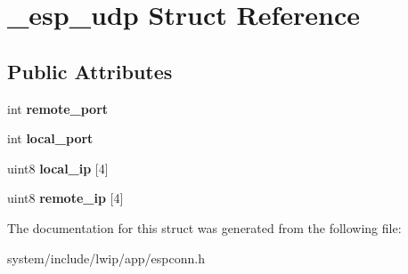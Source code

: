 \hypertarget{struct__esp__udp}{}\section{\+\_\+esp\+\_\+udp Struct Reference}
\label{struct__esp__udp}
\subsection*{Public Attributes}
\begin{DoxyCompactItemize}
\item 
\hypertarget{struct__esp__udp_ac8342d90f426d0ff9bbc1c8be704eaa0}{}int {\bfseries remote\+\_\+port}\label{struct__esp__udp_ac8342d90f426d0ff9bbc1c8be704eaa0}

\item 
\hypertarget{struct__esp__udp_a2c64465322b3d33e8866ff2c87cc1c60}{}int {\bfseries local\+\_\+port}\label{struct__esp__udp_a2c64465322b3d33e8866ff2c87cc1c60}

\item 
\hypertarget{struct__esp__udp_a9b4c948859d38e13285039031ed332d8}{}uint8 {\bfseries local\+\_\+ip} \mbox{[}4\mbox{]}\label{struct__esp__udp_a9b4c948859d38e13285039031ed332d8}

\item 
\hypertarget{struct__esp__udp_ad5777990ffa84237058d9032ea2cce22}{}uint8 {\bfseries remote\+\_\+ip} \mbox{[}4\mbox{]}\label{struct__esp__udp_ad5777990ffa84237058d9032ea2cce22}

\end{DoxyCompactItemize}


The documentation for this struct was generated from the following file\+:\begin{DoxyCompactItemize}
\item 
system/include/lwip/app/espconn.\+h\end{DoxyCompactItemize}
